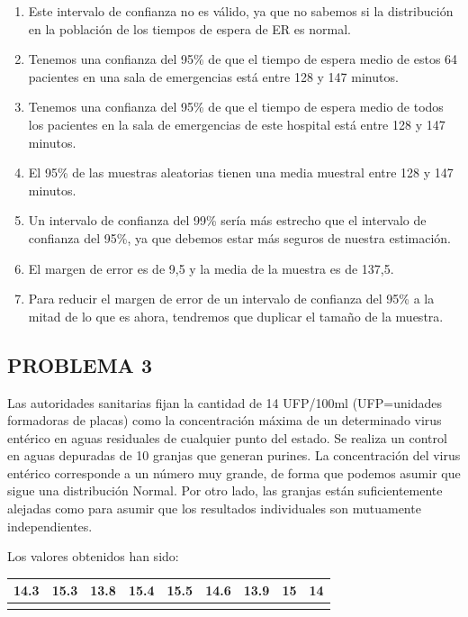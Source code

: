 \documentclass[
]{article}
\providecommand{\tightlist}{%
  \setlength{\itemsep}{0pt}\setlength{\parskip}{0pt}}
\begin{document}
\begin{enumerate}
\def\labelenumi{\alph{enumi})}
\tightlist
\item
  Este intervalo de confianza no es válido, ya que no sabemos si la distribución en la población de los tiempos de espera de ER es normal.\\
\item
  Tenemos una confianza del 95\% de que el tiempo de espera medio de estos 64 pacientes en una sala de emergencias está entre 128 y 147 minutos.\\
\item
  Tenemos una confianza del 95\% de que el tiempo de espera medio de todos los pacientes en la sala de emergencias de este hospital está entre 128 y 147 minutos.\\
\item
  El 95\% de las muestras aleatorias tienen una media muestral entre 128 y 147 minutos.\\
\item
  Un intervalo de confianza del 99\% sería más estrecho que el intervalo de confianza del 95\%, ya que debemos estar más seguros de nuestra estimación.\\
\item
  El margen de error es de 9,5 y la media de la muestra es de 137,5.\\
\item
  Para reducir el margen de error de un intervalo de confianza del 95\% a la mitad de lo que es ahora, tendremos que duplicar el tamaño de la muestra.
\end{enumerate}

\subsection{PROBLEMA 3}\label{problema-3-1}

Las autoridades sanitarias fijan la cantidad de 14 UFP/100ml (UFP=unidades formadoras de placas) como la concentración máxima de un determinado virus entérico en aguas residuales de cualquier punto del estado. Se realiza un control en aguas depuradas de 10 granjas que generan purines. La concentración del virus entérico corresponde a un número muy grande, de forma que podemos asumir que sigue una distribución Normal. Por otro lado, las granjas están suficientemente alejadas como para asumir que los resultados individuales son mutuamente independientes.

Los valores obtenidos han sido:

\begin{longtable}[]{@{}lllllllll@{}}
\toprule\noalign{}
14.3 & 15.3 & 13.8 & 15.4 & 15.5 & 14.6 & 13.9 & 15 & 14 \\
\midrule\noalign{}
\endhead
\bottomrule\noalign{}
\endlastfoot
\end{longtable}
\end{document}
